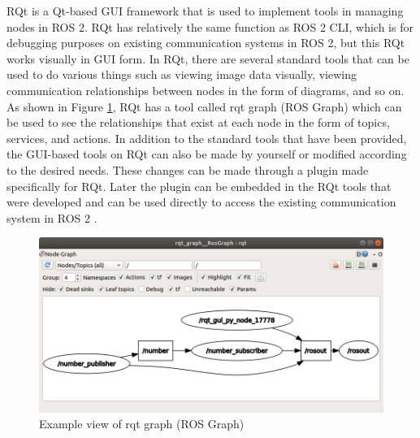 RQt is a Qt-based GUI framework that is used to implement tools in managing nodes in ROS 2. RQt has relatively the same function as ROS 2 CLI, which is for debugging purposes on existing communication systems in ROS 2, but this RQt works visually in GUI form. In RQt, there are several standard tools that can be used to do various things such as viewing image data visually, viewing communication relationships between nodes in the form of diagrams, and so on.
As shown in Figure \ref{fig:rqtgraph}, RQt has a tool called rqt graph (ROS Graph) which can be used to see the relationships that exist at each node in the form of topics, services, and actions.
In addition to the standard tools that have been provided, the GUI-based tools on RQt can also be made by yourself or modified according to the desired needs. These changes can be made through a plugin made specifically for RQt. Later the plugin can be embedded in the RQt tools that were developed and can be used directly to access the existing communication system in ROS 2 \parencite{fikri2021}.
\begin{figure}[ht]
  \centering
  \includegraphics[scale=0.45]{gambar/rqt_graph.png}
  \caption{Example view of rqt graph (ROS Graph)}
  \label{fig:rqtgraph}
\end{figure}